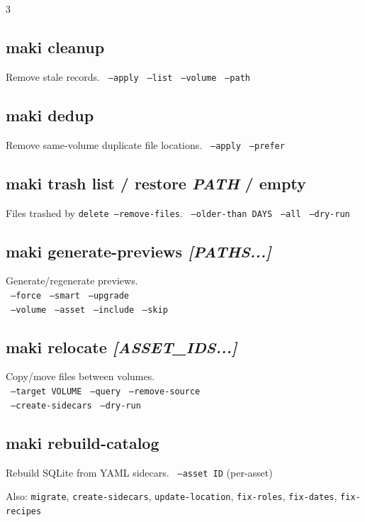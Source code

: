 \documentclass[a4paper,landscape,8pt]{article}
\newcommand{\cmd}[1]{\texttt{\footnotesize #1}}
\newcommand{\opt}[1]{\texttt{\scriptsize\color{maki-stone} #1}}
\begin{document}
\begin{multicols}{3}
\subsection{maki cleanup}
Remove stale records. \opt{--apply} \opt{--list} \opt{--volume} \opt{--path}

\subsection{maki dedup}
Remove same-volume duplicate file locations. \opt{--apply} \opt{--prefer}

\subsection{maki trash list / restore \textit{PATH} / empty}
Files trashed by \cmd{delete --remove-files}. \opt{--older-than DAYS} \opt{--all} \opt{--dry-run}

\subsection{maki generate-previews \textit{[PATHS...]}}
Generate/regenerate previews. \\
\opt{--force} \opt{--smart} \opt{--upgrade} \\
\opt{--volume} \opt{--asset} \opt{--include} \opt{--skip}

\subsection{maki relocate \textit{[ASSET\_IDS...]}}
Copy/move files between volumes. \\
\opt{--target VOLUME} \opt{--query} \opt{--remove-source} \\
\opt{--create-sidecars} \opt{--dry-run}

\subsection{maki rebuild-catalog}
Rebuild SQLite from YAML sidecars. \opt{--asset ID} (per-asset)

{\color{maki-stone}\scriptsize Also: \cmd{migrate}, \cmd{create-sidecars}, \cmd{update-location}, \cmd{fix-roles}, \cmd{fix-dates}, \cmd{fix-recipes}}

\end{multicols}

\newpage

\end{document}
